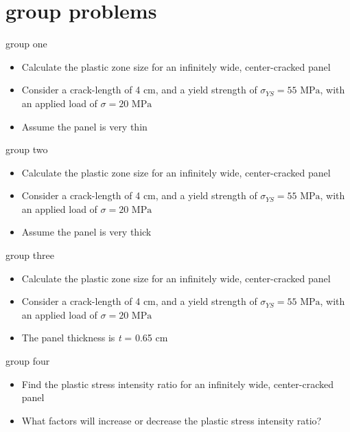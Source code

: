 \documentclass[
  letterpaper,
  ignorenonframetext,
  aspectratio=43,
  handout,
  12pt]{beamer}
\providecommand{\tightlist}{%
  \setlength{\itemsep}{0pt}\setlength{\parskip}{0pt}}
\providecommand{\tightlist}{%
\setlength{\itemsep}{0pt}\setlength{\parskip}{0pt}}
\begin{document}
\hypertarget{group-problems}{%
\section{group problems}\label{group-problems}}

\begin{frame}{group one}
\protect\hypertarget{group-one}{}
\begin{itemize}
\tightlist
\item
  Calculate the plastic zone size for an infinitely wide, center-cracked
  panel
\item
  Consider a crack-length of 4 cm, and a yield strength of
  \(\sigma_{YS}=55 \text{ MPa}\), with an applied load of
  \(\sigma = 20 \text{ MPa}\)
\item
  Assume the panel is very thin
\end{itemize}
\end{frame}

\begin{frame}{group two}
\protect\hypertarget{group-two}{}
\begin{itemize}
\tightlist
\item
  Calculate the plastic zone size for an infinitely wide, center-cracked
  panel
\item
  Consider a crack-length of 4 cm, and a yield strength of
  \(\sigma_{YS}=55 \text{ MPa}\), with an applied load of
  \(\sigma = 20 \text{ MPa}\)
\item
  Assume the panel is very thick
\end{itemize}
\end{frame}

\begin{frame}{group three}
\protect\hypertarget{group-three}{}
\begin{itemize}
\tightlist
\item
  Calculate the plastic zone size for an infinitely wide, center-cracked
  panel
\item
  Consider a crack-length of 4 cm, and a yield strength of
  \(\sigma_{YS}=55 \text{ MPa}\), with an applied load of
  \(\sigma = 20 \text{ MPa}\)
\item
  The panel thickness is \emph{t} = 0.65 cm
\end{itemize}
\end{frame}

\begin{frame}{group four}
\protect\hypertarget{group-four}{}
\begin{itemize}
\tightlist
\item
  Find the plastic stress intensity ratio for an infinitely wide,
  center-cracked panel
\item
  What factors will increase or decrease the plastic stress intensity
  ratio?
\end{itemize}
\end{frame}
\end{document}
